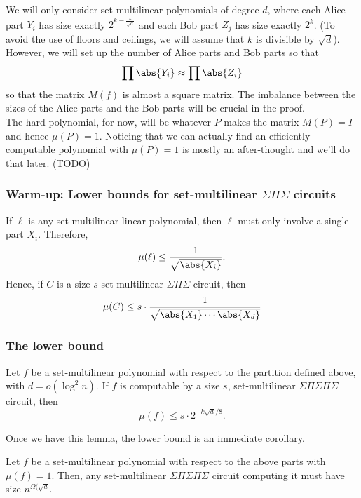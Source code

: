 We will only consider set-multilinear polynomials of degree $d$, where each Alice part $Y_i$ has size exactly $2^{k - \frac{k}{\sqrt{d}}}$ and each Bob part $Z_j$ has size exactly $2^k$. (To avoid the use of floors and ceilings, we will assume that $k$ is divisible by $\sqrt{d}$). However, we will set up the number of Alice parts and Bob parts so that
\[
  \prod \abs{Y_i} \approx \prod \abs{Z_i}
\]
so that the matrix $M(f)$ is almost a square matrix. The imbalance between the sizes of the Alice parts and the Bob parts will be crucial in the proof.\\

The hard polynomial, for now, will be whatever $P$ makes the matrix $M(P) = I$ and hence $\mu(P) = 1$. Noticing that we can actually find an efficiently computable polynomial with $\mu(P) = 1$ is mostly an after-thought and we'll do that later. (TODO)

\subsubsection{Warm-up: Lower bounds for set-multilinear $\Sigma\Pi\Sigma$ circuits}

If $\ell$ is any set-multilinear linear polynomial, then $\ell$ must only involve a single part $X_i$. Therefore,
\[
  \mu(\ell) \leq \frac{1}{\sqrt{\abs{X_i}}}. 
\]
Hence, if $C$ is a size $s$ set-multilinear $\Sigma\Pi\Sigma$ circuit, then
\[
  \mu(C) \leq s \cdot \frac{1}{\sqrt{\abs{X_1} \cdots \abs{X_d}}}
\]

\subsubsection{The lower bound}

\begin{lemma}\label{lem:lb-sml-depth-5}
  Let $f$ be a set-multilinear polynomial with respect to the partition defined above, with $d = o(\log^2 n)$. If $f$ is computable by a size $s$, set-multilinear $\Sigma\Pi\Sigma\Pi\Sigma$ circuit, then
  \[
    \mu(f) \leq s \cdot 2^{-k \sqrt{d}/8}. 
  \]
\end{lemma}

Once we have this lemma, the lower bound is an immediate corollary.

\begin{corollarywp}
  Let $f$ be a set-multilinear polynomial with respect to the above parts with $\mu(f) = 1$. Then, any set-multilinear $\Sigma\Pi\Sigma\Pi\Sigma$ circuit computing it must have size $n^{\Omega(\sqrt{d}}$. 
\end{corollarywp}


